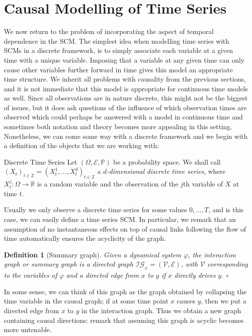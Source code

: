\documentclass[11pt, a4paper]{memoir}
\theoremstyle{break}
\theoremstyle{break}
\newtheorem{innerdefn}{Definition}
\newenvironment{defn}
  {\begin{innerdefn}}
  {\ensuremath{\circ}\end{innerdefn}}
\theoremstyle{nonumberplain}
\newcommand{\mZ}{\mathbb{Z}}
\newcommand{\mR}{\mathbb{R}}
\newcommand{\mP}{\mathbb{P}}
\begin{document}
\section{Causal Modelling of Time Series}
We now return to the problem of incorporating the aspect of temporal dependence in the SCM. The simplest idea when modelling time series with SCMs in a discrete framework, is to simply associate each variable at a given time with a unique variable. Imposing that a variable at any given time can only cause other variables further forward in time gives this model an appropriate time structure. We inherit all problems with causality from the previous sections, and it is not immediate that this model is appropriate for continuous time models as well. Since all observations are in nature discrete, this might not be the biggest of issues, but it does ask questions of the influence of which observation times are observed which could perhaps be answered with a model in continuous time and sometimes both notation and theory becomes more appealing in this setting. Nonetheless, we can come some way with a discrete framework and we begin with a definition of the objects that we are working with:
\begin{mydefinition}{Discrete Time Series}
Let $(\Omega,\mathcal{E},\mP)$ be a probability space. We shall call $(X_t)_{t\in \mZ}=(X_t^{1},\ldots,X_{t}^d)_{t\in \mZ}$ a \emph{$d$-dimensional discrete time series}, where $X_t^j:\Omega\to \mR$ is a random variable and the observation of the $j$th variable of $X$ at time $t$.\\[5pt]
\end{mydefinition}
Usually we only observe a discrete time series for some values $0,\ldots, T$, and is this case, we can easily define a time series SCM. In particular, we remark that an assumption of no instantaneous effects on top of causal links following the flow of time automatically ensures the acyclicity of the graph.
\begin{defn}[Summary graph]
Given a dynamical system $\varphi$, the \emph{interaction graph} or \emph{summary graph} is a directed graph $\mathcal{IG}_\varphi=(\mathcal{V},\mathcal{E})$, with $\mathcal{V}$ corresponding to the variables of $\varphi$ and a directed edge from $x$ to $y$ if $x$ directly drives $y$.
\end{defn}
In some sense, we can think of this graph as the graph obtained by collapsing the time variable in the causal graph; if at some time point $x$ causes $y$, then we put a directed edge from $x$ to $y$ in the interaction graph. Thus we obtain a new graph containing causal directions: remark that assuming this graph is acyclic becomes more untenable.\\\\
\end{document}
